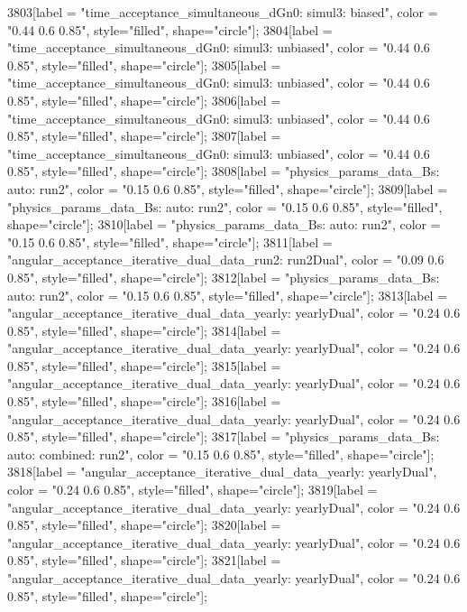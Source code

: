 {	3803[label = "time_acceptance_simultaneous_dGn0\ntimeacc: simul3\ntrigger: biased", color = "0.44 0.6 0.85", style="filled", shape="circle"];
	3804[label = "time_acceptance_simultaneous_dGn0\ntimeacc: simul3\ntrigger: unbiased", color = "0.44 0.6 0.85", style="filled", shape="circle"];
	3805[label = "time_acceptance_simultaneous_dGn0\ntimeacc: simul3\ntrigger: unbiased", color = "0.44 0.6 0.85", style="filled", shape="circle"];
	3806[label = "time_acceptance_simultaneous_dGn0\ntimeacc: simul3\ntrigger: unbiased", color = "0.44 0.6 0.85", style="filled", shape="circle"];
	3807[label = "time_acceptance_simultaneous_dGn0\ntimeacc: simul3\ntrigger: unbiased", color = "0.44 0.6 0.85", style="filled", shape="circle"];
	3808[label = "physics_params_data_Bs\nfit: auto\nyear: run2", color = "0.15 0.6 0.85", style="filled", shape="circle"];
	3809[label = "physics_params_data_Bs\nfit: auto\nyear: run2", color = "0.15 0.6 0.85", style="filled", shape="circle"];
	3810[label = "physics_params_data_Bs\nfit: auto\nyear: run2", color = "0.15 0.6 0.85", style="filled", shape="circle"];
	3811[label = "angular_acceptance_iterative_dual_data_run2\nangacc: run2Dual", color = "0.09 0.6 0.85", style="filled", shape="circle"];
	3812[label = "physics_params_data_Bs\nfit: auto\nyear: run2", color = "0.15 0.6 0.85", style="filled", shape="circle"];
	3813[label = "angular_acceptance_iterative_dual_data_yearly\nangacc: yearlyDual", color = "0.24 0.6 0.85", style="filled", shape="circle"];
	3814[label = "angular_acceptance_iterative_dual_data_yearly\nangacc: yearlyDual", color = "0.24 0.6 0.85", style="filled", shape="circle"];
	3815[label = "angular_acceptance_iterative_dual_data_yearly\nangacc: yearlyDual", color = "0.24 0.6 0.85", style="filled", shape="circle"];
	3816[label = "angular_acceptance_iterative_dual_data_yearly\nangacc: yearlyDual", color = "0.24 0.6 0.85", style="filled", shape="circle"];
	3817[label = "physics_params_data_Bs\nfit: auto\ntrigger: combined\nyear: run2", color = "0.15 0.6 0.85", style="filled", shape="circle"];
	3818[label = "angular_acceptance_iterative_dual_data_yearly\nangacc: yearlyDual", color = "0.24 0.6 0.85", style="filled", shape="circle"];
	3819[label = "angular_acceptance_iterative_dual_data_yearly\nangacc: yearlyDual", color = "0.24 0.6 0.85", style="filled", shape="circle"];
	3820[label = "angular_acceptance_iterative_dual_data_yearly\nangacc: yearlyDual", color = "0.24 0.6 0.85", style="filled", shape="circle"];
	3821[label = "angular_acceptance_iterative_dual_data_yearly\nangacc: yearlyDual", color = "0.24 0.6 0.85", style="filled", shape="circle"];
}
